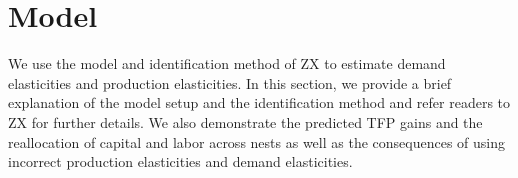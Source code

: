 \documentclass[12pt]{article}
\begin{document}

%

\section{Model} \label{sec:ch3model}
We use the model and identification method of ZX to estimate demand elasticities and production elasticities. In this section, we provide a brief explanation of the model setup and the identification method and refer readers to ZX for further details. We also demonstrate the predicted TFP gains and the reallocation of capital and labor across nests as well as the consequences of using incorrect production elasticities and demand elasticities. 
\end{document}
